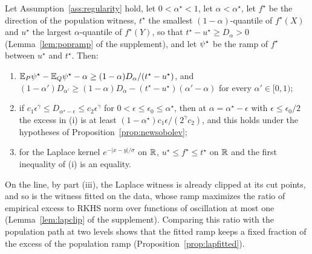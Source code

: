 \begin{proposition}
\label{prop:excess}
Let Assumption~\ref{ass:regularity} hold, let $0<\alpha^\star<1$, let $\alpha<\alpha^\star$, let $f^\star$ be the
direction of the population witness, $t^\star$ the smallest $(1-\alpha)$-quantile of $f^\star(X)$ and $u^\star$ the
largest $\alpha$-quantile of $f^\star(Y)$, so that $t^\star-u^\star\ge D_\alpha>0$ (Lemma~\ref{lem:popramp} of the
supplement), and let $\psi^\star$ be the ramp of $f^\star$ between $u^\star$ and $t^\star$. Then:
\begin{enumerate}[label=(\roman*),leftmargin=*]
\item $\mathbb{E}_P\psi^\star-\mathbb{E}_Q\psi^\star-\alpha\ge(1-\alpha)D_\alpha/(t^\star-u^\star)$, and
$(1-\alpha')D_{\alpha'}\ge(1-\alpha)D_\alpha-(t^\star-u^\star)(\alpha'-\alpha)$ for every $\alpha'\in[0,1)$;
\item if $c_1\epsilon^\gamma\le D_{\alpha^\star-\epsilon}\le c_2\epsilon^\gamma$ for $0<\epsilon\le\epsilon_0\le\alpha^\star$, then
at $\alpha=\alpha^\star-\epsilon$ with $\epsilon\le\epsilon_0/2$ the excess in (i) is at least
$(1-\alpha^\star)c_1\epsilon/(2^\gamma c_2)$, and this holds under the hypotheses of Proposition~\ref{prop:newsobolev};
\item for the Laplace kernel $e^{-|x-y|/\sigma}$ on $\mathbb{R}$, $u^\star\le f^\star\le t^\star$ on $\mathbb{R}$ and the first
inequality of (i) is an equality.
\end{enumerate}
\end{proposition}

On the line, by part (iii), the Laplace witness is already clipped at its cut points, and so is the witness fitted on
the data, whose ramp maximizes the ratio of empirical excess to RKHS norm over functions of oscillation at most one
(Lemma~\ref{lem:lapclip} of the supplement). Comparing this ratio with the population path at two levels shows that the
fitted ramp keeps a fixed fraction of the excess of the population ramp (Proposition~\ref{prop:lapfitted}).

